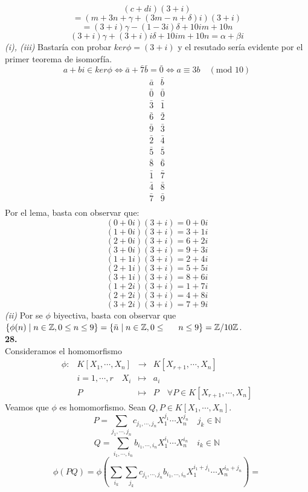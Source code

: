 \documentclass{article}
\newcommand{\bb}[1]{\mathbb{#1}}
\begin{document}
\begin{multicols}{2}
$$
(c+di)(3+i)
$$
$$
=(m+3n+\gamma+(3m-n+\delta)i)(3+i)
$$
$$
=(3 + i) \gamma - (1 - 3 i) \delta + 10 i m + 10 n
$$
$$
(3 + i) \gamma + (3+i) i\delta + 10 i m + 10 n = \alpha + \beta i
$$
\indent \textit{(i), (iii)} Bastaría con probar $ker\phi = (3 + i)$ y \indent el resutado sería evidente por el primer teorema \indent de isomorfía.
$$
a+bi\in ker\phi \Leftrightarrow \bar{a}+\bar{7}\bar{b}= \bar{0} \Leftrightarrow a \equiv 3b \quad (\text{mod } 10)
$$
$$
\begin{array}{c|c}
    \bar{a} & \bar{b} \\ \hline
    \bar{0}&\bar{0} \\ 
    \bar{3}&\bar{1} \\ 
    \bar{6}&\bar{2} \\ 
    \bar{9}&\bar{3} \\ 
    \bar{2}&\bar{4} \\ 
    \bar{5}&\bar{5} \\ 
    \bar{8}&\bar{6} \\ 
    \bar{1}&\bar{7} \\ 
    \bar{4}&\bar{8} \\ 
    \bar{7}&\bar{9} \\ 
\end{array}
$$
\indent Por el lema, basta con observar que:
$$ 
 (0+0i)(3+i)=0+0i 
 $$
 $$ 
 (1+0i)(3+i)=3+1i 
 $$
 $$ 
 (2+0i)(3+i)=6+2i 
 $$
 $$ 
 (3+0i)(3+i)=9+3i 
 $$
 $$ 
 (1+1i)(3+i)=2+4i 
 $$
 $$ 
 (2+1i)(3+i)=5+5i 
 $$
 $$ 
 (3+1i)(3+i)=8+6i 
 $$
 $$ 
 (1+2i)(3+i)=1+7i 
 $$
 $$ 
 (2+2i)(3+i)=4+8i 
 $$
 $$ 
 (3+2i)(3+i)=7+9i 
 $$
\indent \textit{(ii)} Por se $\phi$ biyectiva, basta con observar que \indent $\{\phi(n)\mid n\in \bb{Z}, 0 \le n\le 9\} = \{\bar{n}\mid n\in \bb{Z}, 0\le \indent n\le 9\} = \bb{Z}/10\bb{Z}$.\\
\textbf{28.}\\
\indent Consideramos el homomorfismo
$$
\begin{array}{rrcl}
\phi : & K[X_1, \cdots, X_n] & \longrightarrow & K[X_{r+1}, \cdots, X_n] \\
&i=1,\cdots,r \quad X_i & \longmapsto     & a_i\\
& P & \longmapsto     & P \quad \forall P\in K[X_{r+1}, \cdots, X_n]
\end{array}
$$
Veamos que $\phi$ es homomorfismo. Sean $Q,P \in K[X_1, \cdots, X_n]$.
$$
P = \sum_{j_1,\cdots, j_n}c_{j_1,\cdots,j_n}X_1^{j_1}\cdots X_n^{j_n} \quad j_k\in \bb{N}
$$
$$
Q = \sum_{i_1,\cdots, i_n}b_{i_1,\cdots,i_n}X_1^{i_1}\cdots X_n^{i_n} \quad i_k\in \bb{N}
$$
$$
\phi(PQ)=\phi\left( \sum_{i_k} \sum_{j_k} c_{j_1,\cdots,j_n} b_{i_1,\cdots,i_n} X_1^{i_1+j_1}\cdots X_n^{i_n+j_n} \right) =
$$
\end{multicols}
\end{document}

